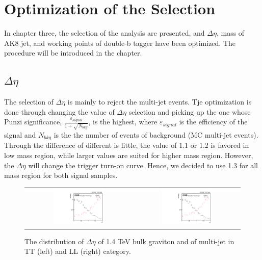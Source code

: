 
\chapter{Optimization of the Selection} \label{Optimization of Selection}
In chapter three, the selection of the analysis are presented, and $\Delta \eta$, mass of AK8 jet, and working points of double-b tagger have been optimized. The procedure will be introduced in the chapter.

\section{$\Delta \eta$}
The selection of $\Delta \eta$ is mainly to reject the multi-jet events. Tje optimization is done through changing the value of $\Delta \eta$ selection and picking up the one whose Punzi significance, $\frac{\varepsilon _{signal}}{1+\sqrt{N_{bkg}}}$, is the highest, where $\varepsilon _{signal}$ is the efficiency of the signal and $N_{bkg}$ is the the number of events of background (MC multi-jet events). Through the difference of different is little, the value of 1.1 or 1.2 is favored in low mass region, while larger values are suited for higher mass region. However, the $\Delta \eta$ will change the trigger turn-on curve. Hence, we decided to use 1.3 for all mass region for both signal samples.

\begin{figure}[t]
  \centering
  \begin{tabular}{cc}
    \includegraphics[width=0.5\textwidth]{Figures/deta/bulk/TT1400.pdf} &
       \includegraphics[width=0.5\textwidth]{Figures/deta/bulk/TT1400.pdf}
  \end{tabular}
  \caption{The distribution of $\Delta \eta$ of 1.4 TeV bulk graviton and of multi-jet in TT (left) and LL (right) category.}

\end{figure}

